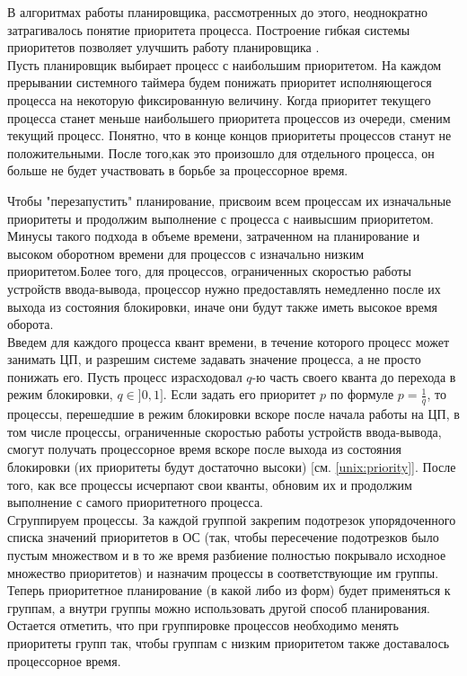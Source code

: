 В алгоритмах работы планировщика, рассмотренных до этого, неоднократно затрагивалось понятие приоритета процесса. Построение гибкая системы приоритетов позволяет улучшить работу планировщика \cite{tanenbaum} \cite{vahalia} .\\

Пусть планировщик выбирает процесс с наибольшим приоритетом. На каждом прерывании системного таймера будем понижать приоритет  исполняющегося процесса на некоторую фиксированную величину. Когда приоритет текущего процесса станет меньше наибольшего приоритета процессов из очереди, сменим текущий процесс. Понятно, что в конце концов приоритеты процессов станут не положительными. После того,как это произошло для отдельного процесса, он больше не будет участвовать в борьбе за процессорное время.
 
Чтобы "перезапустить" планирование, присвоим всем процессам их изначальные приоритеты и продолжим выполнение с процесса с наивысшим приоритетом. Минусы такого подхода в объеме времени, затраченном на планирование и высоком оборотном времени для процессов с изначально низким приоритетом.Более того, для процессов, ограниченных скоростью работы устройств ввода-вывода, процессор нужно предоставлять немедленно после их выхода из состояния блокировки, иначе они будут также иметь высокое время оборота.\\

Введем для каждого процесса квант времени, в течение которого процесс может занимать ЦП, и разрешим системе задавать значение процесса, а не просто понижать его. Пусть процесс израсходовал $q$-ю часть своего кванта до перехода в режим блокировки, $q \in ]0,1]$. Если задать его приоритет $p$ по формуле $p = \frac{1}{q}$, то процессы, перешедшие в режим блокировки вскоре после начала работы на ЦП, в том числе процессы, ограниченные скоростью работы устройств ввода-вывода, смогут получать процессорное время вскоре после выхода из состояния блокировки (их приоритеты будут достаточно высоки) [см. \ref{unix:priority}]. После того, как все процессы исчерпают свои кванты, обновим их и продолжим выполнение с самого приоритетного процесса.\\

Сгруппируем процессы. За каждой группой закрепим подотрезок упорядоченного списка значений приоритетов в ОС (так, чтобы пересечение подотрезков было пустым множеством и в то же время разбиение полностью покрывало исходное множество приоритетов) и назначим процессы в соответствующие им группы. Теперь приоритетное планирование (в какой либо из форм) будет применяться к группам, а внутри группы можно использовать другой способ планирования. Остается отметить, что при группировке процессов необходимо менять приоритеты групп так, чтобы группам с низким приоритетом также доставалось процессорное время.
   